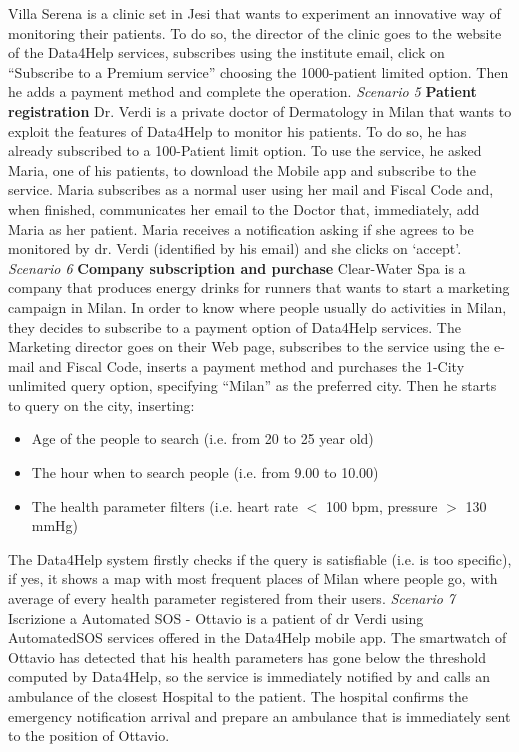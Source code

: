 Villa Serena is a clinic set in Jesi that wants to experiment an innovative way of monitoring their patients. To do so, the director of the clinic goes to the website of the Data4Help services, subscribes using the institute email, click on “Subscribe to a Premium service” choosing the 1000-patient limited option. Then he adds a payment method and complete the operation.
\vspace{2mm} \newline
\noindent \emph{Scenario 5} \textbf{Patient registration} \newline
Dr. Verdi is a private doctor of Dermatology in Milan that wants to exploit the features of Data4Help to monitor his patients. To do so, he has already subscribed to a 100-Patient limit option. To use the service, he asked Maria, one of his patients, to download the Mobile app and subscribe to the service.
Maria subscribes as a normal user using her mail and Fiscal Code and, when finished, communicates her email to the Doctor that, immediately, add Maria as her patient. Maria receives a notification asking if she agrees to be monitored by dr. Verdi (identified by his email) and she clicks on ‘accept’.
\vspace{2mm}\newline
\noindent \emph{Scenario 6} \textbf{Company subscription and purchase} \newline
Clear-Water Spa is a company that produces energy drinks for runners that wants to start a marketing campaign in Milan. In order to know where people usually do activities in Milan, they decides to subscribe to a payment option of Data4Help services. The Marketing director goes on their Web page, subscribes to the service using the e-mail and Fiscal Code, inserts a payment method and purchases the 1-City unlimited query option, specifying “Milan” as the preferred city.
Then he starts to query on the city, inserting:
\begin{itemize}
    \item Age of the people to search (i.e. from 20 to 25 year old)
    \item The hour when to search people (i.e. from 9.00 to 10.00)
    \item The health parameter filters (i.e. heart rate $<$ 100 bpm, pressure $>$ 130 mmHg)
\end{itemize}
 The Data4Help system firstly checks if the query is satisfiable (i.e. is too specific), if yes, it shows a map with most frequent places of Milan where people go, with average of every health parameter registered from their users.
\vspace{2mm} \newline
\noindent \emph{Scenario 7} Iscrizione a Automated SOS - Ottavio is a patient of dr Verdi using AutomatedSOS services offered in the Data4Help mobile app. The smartwatch of Ottavio has detected that his health parameters has gone below the threshold computed by Data4Help, so the service is immediately notified by and calls an ambulance of the closest Hospital to the patient. The hospital confirms the emergency notification arrival and prepare an ambulance that is immediately sent to the position of Ottavio.

